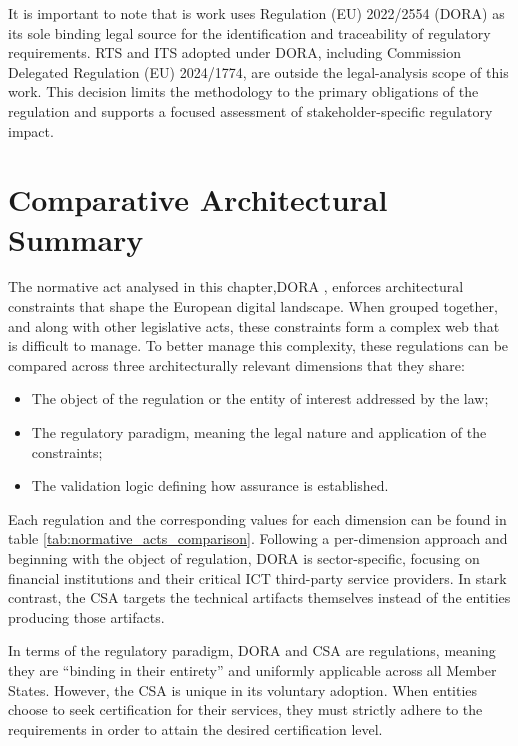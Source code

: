 It is important to note that is work uses Regulation (EU) 2022/2554 (\ac{DORA}) as its sole binding legal source for the identification and traceability of regulatory requirements. \ac{RTS} and \ac{ITS} adopted under \ac{DORA}, including Commission Delegated Regulation (EU) 2024/1774, are outside the legal-analysis scope of this work. This decision limits the methodology to the primary obligations of the regulation and supports a focused assessment of stakeholder-specific regulatory impact.

\iffalse
\section{Comparative Architectural Summary}

The normative act analysed in this chapter,\ac{DORA} , enforces architectural constraints that shape the European digital landscape. When grouped together, and along with other legislative acts, these constraints form a complex web that is difficult to manage. To better manage this complexity, these regulations can be compared across three architecturally relevant dimensions that they share:
\begin{itemize}
    \item The object of the regulation or the entity of interest addressed by the law;
    \item The regulatory paradigm, meaning the legal nature and application of the constraints;
    \item The validation logic defining how assurance is established.
\end{itemize}

Each regulation and the corresponding values for each dimension can be found in table \ref{tab:normative_acts_comparison}. Following a per-dimension approach and beginning with the object of regulation, \ac{DORA} is sector-specific, focusing on financial institutions and their critical \ac{ICT} third-party service providers. In stark contrast, the \ac{CSA} targets the technical artifacts themselves instead of the entities producing those artifacts.

In terms of the regulatory paradigm, \ac{DORA} and \ac{CSA} are regulations, meaning they are ``binding in their entirety'' and uniformly applicable across all Member States. However, the \ac{CSA} is unique in its voluntary adoption. When entities choose to seek certification for their services, they must strictly adhere to the requirements in order to attain the desired certification level.

